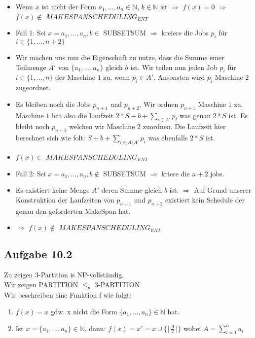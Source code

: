 \begin{itemize}
	\item Wenn $x$ ist nicht der Form $a_1,...,a_n \in \mathbb{N}$, $b \in \mathbb{N}$ ist $\Rightarrow$ $f(x) = 0$ $\Rightarrow$ 
		$f(x) \not\in $ $MAKESPANSCHEDULING_{ENT}$
	\item Fall 1: Sei $x = a_1,...,a_n,b \in$ SUBSETSUM $\Rightarrow$ kreiere die Jobs $p_i$ für $i \in \{1,...,n+2\}$
	\item Wir machen uns nun die Eigenschaft zu nutze, dass die Summe einer Teilmenge $A'$ von $\{a_1,...,a_n\}$ gleich $b$ ist.
		Wir teilen nun jeden Job $p_i$ für $i \in \{1,...,n\}$ der Maschine $1$ zu, wenn $p_i \in A'$. Ansonsten wird $p_i$ Maschine $2$ zugeordnet.
	\item Es bleiben noch die Jobs $p_{n+1}$ und $p_{n+2}$. Wir ordnen $p_{n+1}$ Maschine $1$ zu. Maschine $1$ hat also die Laufzeit
		$2*S - b + \sum_{i \in A'} p_i$ was genau $2*S$ ist. Es bleibt noch $p_{n+2}$ welchen wir Maschine $2$ zuordnen. 
		Die Laufzeit hier berechnet sich wie folt: $S + b + \sum_{i \in A \setminus A'}p_i$ was ebenfalls $2*S$ ist.
	\item $f(x) \in $ $MAKESPANSCHEDULING_{ENT}$
	\item Fall 2: Sei $x = a_1,...,a_n,b \not\in$ SUBSETSUM $\Rightarrow$ kriere die $n+2$ jobs.
	\item Es existiert keine Menge $A'$ deren Summe gleich $b$ ist. $\Rightarrow$ Auf Grund unserer Konstruktion der Laufzeiten von
		$p_{n+1}$ und $p_{n+2}$ existiert kein Schedule der genau den geforderten MakeSpan hat.
	\item $\Rightarrow$ $f(x) \not\in$ $MAKESPANSCHEDULING_{ENT}$
\end{itemize}

\newpage
\subsection*{Aufgabe 10.2}
Zu zeigen 3-Partition is NP-vollständig.\\

Wir zeigen PARTITION $\le_p$ 3-PARTITION\\

Wir beschreiben eine Funktion f wie folgt:

\begin{enumerate}
	\item $f(x) = x$ gdw. x nicht die Form $\{a_1, ..., a_n\} \in \mathbb{N}$ hat.
	\item Ist $x = \{a_1, ..., a_n\} \in \mathbb{N}$, dann: $f(x) = x' = x \cup \{\lceil\frac{A}{2}\rceil\}$ wobei $A = \sum_{i=1}^{n}{a_i}$
\end{enumerate}

